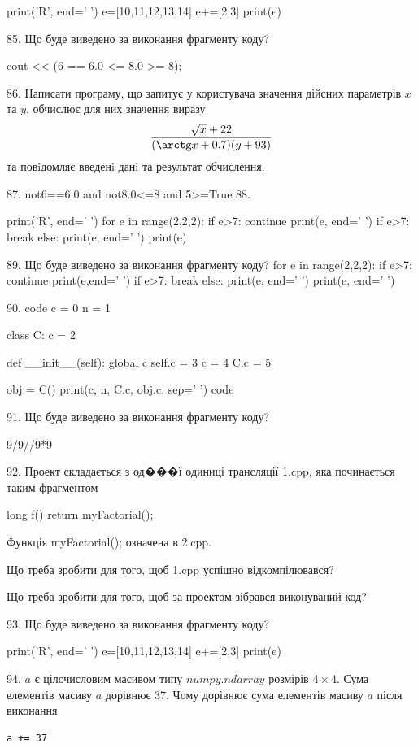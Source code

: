 \documentclass[11pt]{article}
\begin{document}
{{print('R', end=' ')
e=[10,11,12,13,14]
e+=[2,3]
print(e)


85. Що буде виведено за виконання фрагменту коду?

cout << (6 == 6.0 <= 8.0 >= 8);

86. 
Написати програму, що запитує у користувача значення дійсних параметрів $x$ та $y$, обчислює для них значення виразу 
$$\frac{\sqrt x + 22}{(\arctg x + 0.7) (y + 93)}$$ 
та повiдомляє введенi данi та результат обчислення.


87. 
not6==6.0 and not8.0<=8 and 5>=True
88. 

print('R', end=' ')
for e in range(2,2,2):
    if e>7:
        continue
        print(e, end=' ')
    if e>7:
        break
    else:
        print(e, end=' ')
    print(e)

89. Що буде виведено за виконання фрагменту коду?
for e in range(2,2,2):
    if e>7:
        continue
        print(e,end=' ')
    if e>7:
        break
else:
    print(e, end=' ')
print(e, end=' ')

90. 
code
c = 0
n = 1

class C:
    c = 2
    
    def __init__(self):
global c        self.c = 3
        c = 4
        C.c = 5

obj = C()
print(c, n, C.c, obj.c, sep=' ')
code

91. Що буде виведено за виконання фрагменту коду?

9/9//9*9

92. 
Проект складається з од���ї одиниці трансляції 1.cpp, яка починається таким фрагментом\par
long f(){ return myFactorial();}\par
Функція myFactorial(); означена в 2.cpp.\par
Що треба зробити для того, щоб 1.cpp успішно відкомпілювався?\par\vspace{1.5cm}
Що треба зробити для того, щоб за проектом зібрався виконуваний код?\par

93. Що буде виведено за виконання фрагменту коду?

print('R', end=' ')
e=[10,11,12,13,14]
e+=[2,3]
print(e)


94. 
$a$ є цілочисловим масивом типу $numpy.ndarray$ розмірів $4{\times}4$. Сума елементів масиву $a$ дорівнює 37. Чому дорівнює сума елементів масиву $a$ після виконання 
\begin{verbatim}
a += 37
\end{verbatim}


}}
\end{document}
